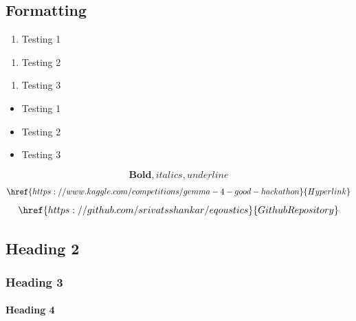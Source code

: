 \documentclass{article}
\begin{document}
\subsection{Formatting}
\begin{enumerate}\item Testing 1\end{enumerate}
\begin{enumerate}\item Testing 2\end{enumerate}
\begin{enumerate}\item Testing 3\end{enumerate}
\begin{itemize}\item Testing 1\end{itemize}
\begin{itemize}\item Testing 2\end{itemize}
\begin{itemize}\item Testing 3\end{itemize}
$$\mathbf{Bold}, \mathit{italics}, \underline{underline}$$
$$\href{https://www.kaggle.com/competitions/gemma-4-good-hackathon}{Hyperlink}$$
$$\href{https://github.com/srivatsshankar/eqoustics}{Github Repository}$$
\subsection{Heading 2}
\subsubsection{Heading 3}
\paragraph{Heading 4}
\end{document}
